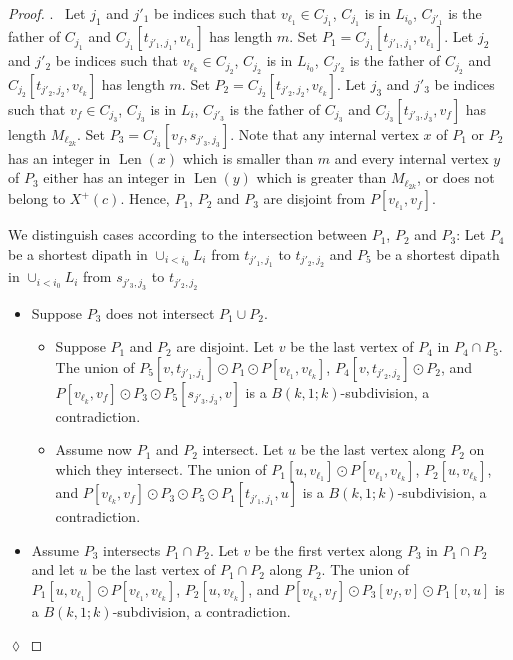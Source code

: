 \documentclass[utf8,10pt]{article}
\theoremstyle{plain}
\theoremstyle{definition}
\theoremstyle{remark}
\newenvironment{subproof}{\par\noindent {\it Subproof}.\ }{\hfill$\lozenge$\par\vspace{11pt}}
\DeclareMathOperator{\Len}{Len}
\begin{document}
\begin{proof}
\begin{subproof}
Let $j_1$ and $j'_1$ be indices such that $v_{\ell_1} \in C_{j_1}$, $C_{j_1}$ is in $L_{i_0}$, $C_{j'_1}$ is the father of $C_{j_1}$ and 
$C_{j_1}[t_{j'_1,j_1},v_{\ell_1}]$ has length $m$. Set $P_1=C_{j_1}[t_{j'_1,j_1},v_{\ell_1}]$.
Let $j_2$ and $j'_2$ be indices such that $v_{\ell_k} \in C_{j_2}$, $C_{j_2}$ is in $L_{i_0}$, $C_{j'_2}$ is the father of $C_{j_2}$  and 
$C_{j_2}[t_{j'_2,j_2},v_{\ell_k}]$ has length $m$. Set $P_2=C_{j_2}[t_{j'_2,j_2},v_{\ell_k}]$.
Let $j_3$ and $j'_3$ be indices such that $v_{f} \in C_{j_3}$, $C_{j_3}$ is in $L_i$, $C_{j'_3}$ is the father of $C_{j_3}$  and 
$C_{j_3}[t_{j'_3,j_3}, v_{f}]$ has length $M_{\ell_{2k}}$. Set $P_3=C_{j_3}[v_{f},s_{j'_3,j_3}]$.
Note that any internal vertex $x$ of $P_1$ or $P_2$ has an integer in $\Len(x)$
which is smaller than $m$ and every internal vertex $y$ of $P_3$  either has an integer in $\Len(y)$ which
is greater than $M_{\ell_{2k}}$, or does not belong to $X^+(c)$. Hence, 
$P_1$, $P_2$ and $P_3$ are disjoint from $P[v_{\ell_1},v_f]$. 

We distinguish cases according to the intersection between $P_1$, $P_2$ and $P_3$:
Let $P_4$ be a shortest dipath in $\cup_{i < i_0} L_i$ from $t_{j'_1,j_1}$ to $t_{j'_2,j_2}$ and
 $P_5$ be a shortest dipath in $\cup_{i < i_0} L_i$ from $s_{j'_3,j_3}$ to $t_{j'_2,j_2}$ 


\begin{itemize}
	\item Suppose $P_3$ does not intersect $P_1 \cup P_2$. 
	\begin{itemize}
		\item Suppose $P_1$ and $P_2$ are disjoint. Let $v$ be the last vertex of $P_4$ in $P_4 \cap P_5$.
The union of $P_5[v, t_{j'_1,j_1}] \odot P_1 \odot P[v_{\ell_1}, v_{\ell_k}]$, $P_4[v,t_{j'_2,j_2}] \odot P_2$,
and $P[v_{\ell_k}, v_f] \odot P_3 \odot P_5[s_{j'_3,j_3}, v]$ is a $B(k,1;k)$-subdivision,  a contradiction.

	
		\item Assume now $P_1$ and $P_2$ intersect. Let $u$ be the last vertex along $P_2$ on which they intersect.
		 The union of $P_1[u,v_{\ell_1}]\odot P[v_{\ell_1}, v_{\ell_k}]$, $P_2[u, v_{\ell_k}]$, and $P[v_{\ell_k}, v_f]\odot P_3\odot P_5 \odot P_1[t_{j'_1,j_1}, u]$ is a $B(k,1;k)$-subdivision, a contradiction.
	\end{itemize}

	\item Assume $P_3$ intersects $P_1\cap P_2$. Let $v$ be the first vertex along $P_3$ in $P_1\cap P_2$ and let $u$ be the last vertex of $P_1\cap P_2$ along $P_2$. The union of $P_1[u,v_{\ell_1}]\odot P[v_{\ell_1}, v_{\ell_k}]$, $P_2[u, v_{\ell_k}]$, and $P[v_{\ell_k}, v_f]\odot P_3[v_f,v]\odot P_1[v, u]$ is a $B(k,1;k)$-subdivision, a contradiction.


\end{itemize}
\end{subproof}
\end{proof}
\end{document}
